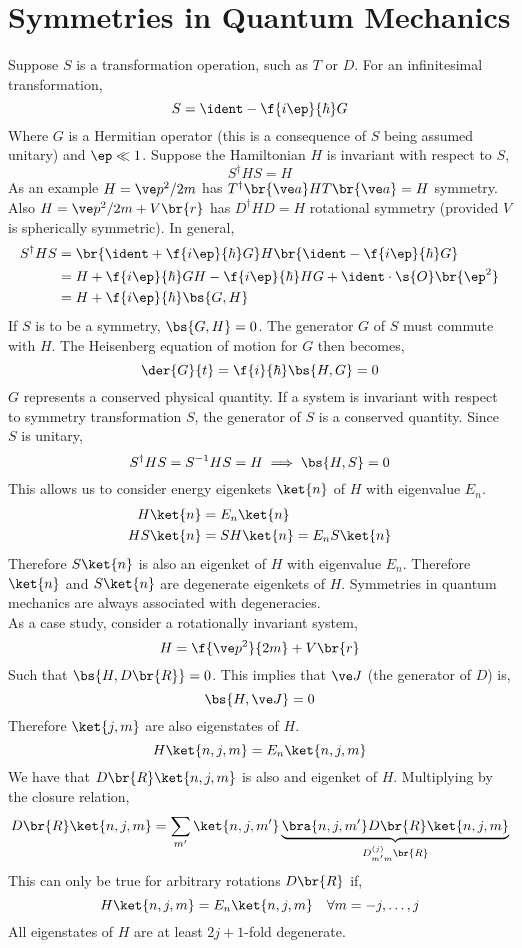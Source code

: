 \documentclass{article}
\begin{document}
\section{Symmetries in Quantum Mechanics}
Suppose $S$ is a transformation operation, such as $T$ or $D$. For an infinitesimal transformation,
\[ S = \ident - \f{i \ep}{\hbar} G \]
Where $G$ is a Hermitian operator (this is a consequence of $S$ being assumed unitary) and $\ep \ll 1$. Suppose the Hamiltonian $H$ is invariant with respect to $S$,
\[ S^{\dagger} H S = H \]
As an example $H = \ve p^2 / 2m$ has $T^{\dagger} \br{\ve a} H T \br{\ve a} = H$ symmetry. Also $H = \ve p^2 / 2m + V\br{r}$ has $D^{\dagger} H D = H$ rotational symmetry (provided $V$ is spherically symmetric). In general,
\begin{align*}
    S^{\dagger} H S
    &= \br{\ident + \f{i \ep}{\hbar} G} H \br{\ident - \f{i \ep}{\hbar} G} \\
    &= H + \f{i\ep}{\hbar} GH - \f{i\ep}{\hbar} HG + \ident \cdot \s{O}\br{\ep^2} \\
    &= H + \f{i\ep}{\hbar} \bs{G, H}
\end{align*}
If $S$ is to be a symmetry, $\bs{G, H} = 0$. The generator $G$ of $S$ must commute with $H$. The Heisenberg equation of motion for $G$ then becomes,
\[ \der{G}{t} = \f{i}{\hbar} \bs{H,G} = 0 \]
$G$ represents a conserved physical quantity. If a system is invariant with respect to symmetry transformation $S$, the generator of $S$ is a conserved quantity. Since $S$ is unitary,
\[ S^{\dagger} H S = S^{-1} H S = H \implies \bs{H,S}=0 \]
This allows us to consider energy eigenkets $\ket{n}$ of $H$ with eigenvalue $E_n$.
\begin{align*}
    H\ket{n} &= E_n \ket{n} \\
    HS\ket{n} &= S H\ket{n} = E_n S\ket{n}
\end{align*}
Therefore $S\ket{n}$ is also an eigenket of $H$ with eigenvalue $E_n$. Therefore $\ket{n}$ and $S\ket{n}$ are degenerate eigenkets of $H$. Symmetries in quantum mechanics are always associated with degeneracies. \\

As a case study, consider a rotationally invariant system,
\[ H = \f{\ve p^2}{2m} + V\br{r} \]
Such that $\bs{H, D\br{R}} = 0$. This implies that $\ve J$ (the generator of $D$) is,
\[ \bs{H, \ve J} = 0 \]
Therefore $\ket{j,m}$ are also eigenstates of $H$.
\[ H\ket{n,j,m} = E_n \ket{n,j,m} \]
We have that $D\br{R} \ket{n,j,m}$ is also and eigenket of $H$. Multiplying by the closure relation,
\[ D\br{R}\ket{n,j,m} = \sum_{m'}\ket{n,j,m'}\underbrace{\bra{n,j,m'}D\br{R}\ket{n,j,m}}_{D^{(j)}_{m'm}\br{R}} \]
This can only be true for arbitrary rotations $D\br{R}$ if,
\[ H \ket{n,j,m} = E_n \ket{n,j,m} \quad \forall m = -j, \ldots, j\]
All eigenstates of $H$ are at least $2j+1$-fold degenerate.\\
\end{document}
